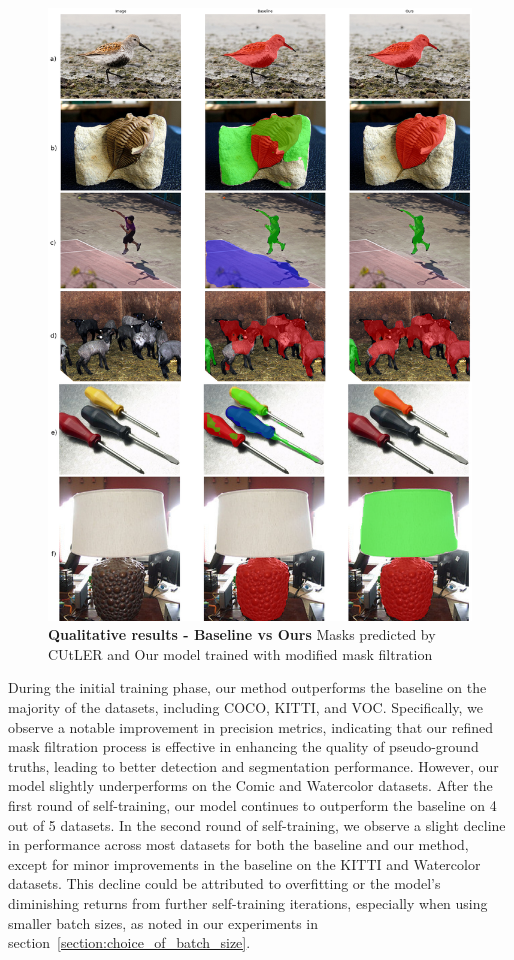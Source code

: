 \begin{figure}
	\centering
	\includegraphics[width=1.05\textwidth]{Images/main/cutler_vs_ours.png}
	\caption[\textbf{Qualitative Results - Baseline vs Ours}]{\textbf{Qualitative results - Baseline vs Ours} Masks predicted by CUtLER and Our model trained with modified mask filtration}
	\label{fig:cuter_vs_ours}
\end{figure} 

During the initial training phase, our method outperforms the baseline on the majority of the datasets, including COCO, KITTI, and VOC. Specifically, we observe a notable improvement in precision metrics, indicating that our refined mask filtration process is effective in enhancing the quality of pseudo-ground truths, leading to better detection and segmentation performance. However, our model slightly underperforms on the Comic and Watercolor datasets. After the first round of self-training, our model continues to outperform the baseline on 4 out of 5 datasets. In the second round of self-training, we observe a slight decline in performance across most datasets for both the baseline and our method, except for minor improvements in the baseline on the KITTI and Watercolor datasets. This decline could be attributed to overfitting or the model’s diminishing returns from further self-training iterations, especially when using smaller batch sizes, as noted in our experiments in section~\ref{section:choice_of_batch_size}.

